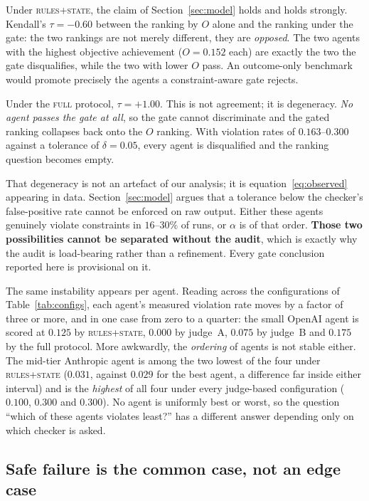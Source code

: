 \documentclass{article}
\begin{document}
Under \textsc{rules+state}, the claim of Section~\ref{sec:model} holds and holds strongly. Kendall's $\tau=-0.60$ between the ranking by $O$ alone and the ranking under the gate: the two rankings are not merely different, they are \emph{opposed}. The two agents with the highest objective achievement ($O=0.152$ each) are exactly the two the gate disqualifies, while the two with lower $O$ pass. An outcome-only benchmark would promote precisely the agents a constraint-aware gate rejects.

Under the \textsc{full} protocol, $\tau=+1.00$. This is not agreement; it is degeneracy. \emph{No agent passes the gate at all}, so the gate cannot discriminate and the gated ranking collapses back onto the $O$ ranking. With violation rates of $0.163$--$0.300$ against a tolerance of $\delta=0.05$, every agent is disqualified and the ranking question becomes empty.

That degeneracy is not an artefact of our analysis; it is equation~\eqref{eq:observed} appearing in data. Section~\ref{sec:model} argues that a tolerance below the checker's false-positive rate cannot be enforced on raw output. Either these agents genuinely violate constraints in $16$--$30\%$ of runs, or $\alpha$ is of that order. \textbf{Those two possibilities cannot be separated without the audit}, which is exactly why the audit is load-bearing rather than a refinement. Every gate conclusion reported here is provisional on it.

The same instability appears per agent. Reading across the configurations of Table~\ref{tab:configs}, each agent's measured violation rate moves by a factor of three or more, and in one case from zero to a quarter: the small OpenAI agent is scored at $0.125$ by \textsc{rules+state}, $0.000$ by judge~A, $0.075$ by judge~B and $0.175$ by the full protocol. More awkwardly, the \emph{ordering} of agents is not stable either. The mid-tier Anthropic agent is among the two lowest of the four under \textsc{rules+state} ($0.031$, against $0.029$ for the best agent, a difference far inside either interval) and is the \emph{highest} of all four under every judge-based configuration ($0.100$, $0.300$ and $0.300$). No agent is uniformly best or worst, so the question ``which of these agents violates least?'' has a different answer depending only on which checker is asked.

\subsection{Safe failure is the common case, not an edge case}
\end{document}
